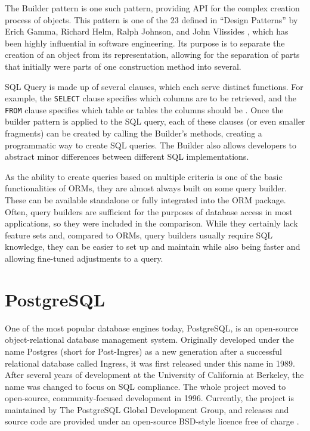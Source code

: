 The Builder pattern is one such pattern, providing API for the complex creation
process of objects. This pattern is one of the 23 defined in \enquote{Design
Patterns} by Erich Gamma, Richard Helm, Ralph Johnson, and John Vlissides
\cite{gamma-design-1995}, which has been highly influential in software
engineering. Its purpose is to separate the creation of an object from its
representation, allowing for the separation of parts that initially were parts
of one construction method into several.

SQL Query is made up of several clauses, which each serve distinct functions.
For example, the \texttt{SELECT} clause specifies which columns are to be
retrieved, and the \texttt{FROM} clause specifies which table or tables the
columns should be \cite{postgres-lexer}. Once the builder pattern is applied to
the SQL query, each of these clauses (or even smaller fragments) can be created
by calling the Builder's methods, creating a programmatic way to create SQL
queries. The Builder also allows developers to abstract minor differences
between different SQL implementations.

As the ability to create queries based on multiple criteria is one of the basic
functionalities of ORMs, they are almost always built on some query builder.
These can be available standalone or fully integrated into the ORM package.
Often, query builders are sufficient for the purposes of database access in most
applications, so they were included in the comparison. While they certainly lack
feature sets and, compared to ORMs, query builders usually require SQL
knowledge, they can be easier to set up and maintain while also being faster and
allowing fine-tuned adjustments to a query.

\section*{PostgreSQL}
One of the most popular database engines today, PostgreSQL, is an open-source
object-relational database management system. Originally developed under the
name Postgres \cite{postres-about} (short for Post-Ingres) as a new generation
after a successful relational database called Ingress, it was first released
under this name in 1989. After several years of development at the University of
California at Berkeley, the name was changed to focus on SQL compliance. The
whole project moved to open-source, community-focused development in 1996.
Currently, the project is maintained by The PostgreSQL Global Development Group,
and releases and source code are provided under an open-source BSD-style licence
free of charge \cite{postgres-licence}.

